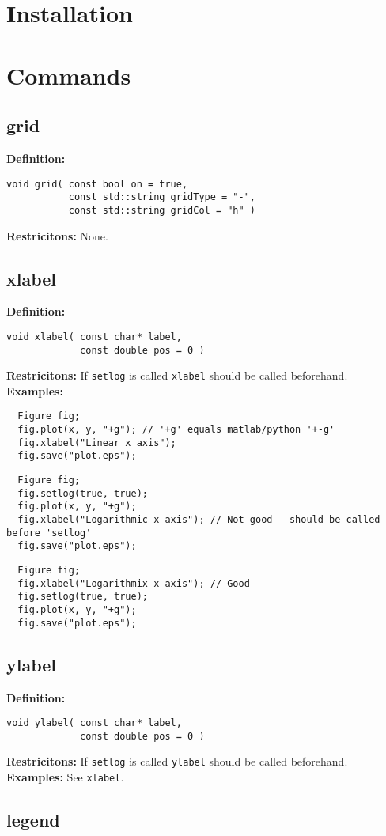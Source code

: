 \documentclass[a4paper]{article}
\newcommand{\command}[1]{\subsection{#1}}
\begin{document}
\section{Installation}

\section{Commands}

\command{grid}

\textbf{Definition:}
\begin{lstlisting}
void grid( const bool on = true, 
           const std::string gridType = "-", 
           const std::string gridCol = "h" )
\end{lstlisting}
%
\textbf{Restricitons:} None.

\command{xlabel}

\textbf{Definition:}
\begin{lstlisting}
void xlabel( const char* label, 
             const double pos = 0 )
\end{lstlisting}
%
\textbf{Restricitons:} If \texttt{setlog} is called \texttt{xlabel} should be called beforehand. \\
%
\textbf{Examples:}
\begin{lstlisting}
  Figure fig;
  fig.plot(x, y, "+g"); // '+g' equals matlab/python '+-g'
  fig.xlabel("Linear x axis");
  fig.save("plot.eps");
\end{lstlisting}
\begin{lstlisting}
  Figure fig;
  fig.setlog(true, true);
  fig.plot(x, y, "+g");
  fig.xlabel("Logarithmic x axis"); // Not good - should be called before 'setlog'
  fig.save("plot.eps");
\end{lstlisting}
\begin{lstlisting}
  Figure fig;
  fig.xlabel("Logarithmix x axis"); // Good
  fig.setlog(true, true);
  fig.plot(x, y, "+g");
  fig.save("plot.eps");
\end{lstlisting}

\command{ylabel}

\textbf{Definition:}
\begin{lstlisting}
void ylabel( const char* label, 
             const double pos = 0 )
\end{lstlisting}
%
\textbf{Restricitons:} If \texttt{setlog} is called \texttt{ylabel} should be called beforehand. \\
%
\textbf{Examples:} See \texttt{xlabel}.

\command{legend}
\end{document}
